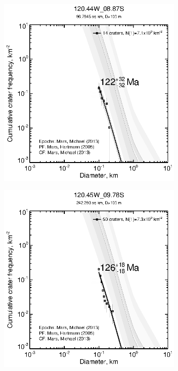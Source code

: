 \documentclass[12pt,letter]{article}
\begin{document}
\begin{figure}[h]
\begin{subfigure}{.33\textwidth}
\end{subfigure}
\begin{subfigure}{.33\textwidth}
  \includegraphics[width=\linewidth,clip,trim=1cm 1cm 1.5cm 1cm]{figures/craterstats/120-44W_08-87S_100m_cum.eps}
\end{subfigure}%
\begin{subfigure}{.33\textwidth}
  \includegraphics[width=\linewidth,clip,trim=1cm 1cm 1.5cm 1cm]{figures/craterstats/120-45W_09-78S_100m_cum.eps}

\end{subfigure}
\end{figure}
\end{document}

